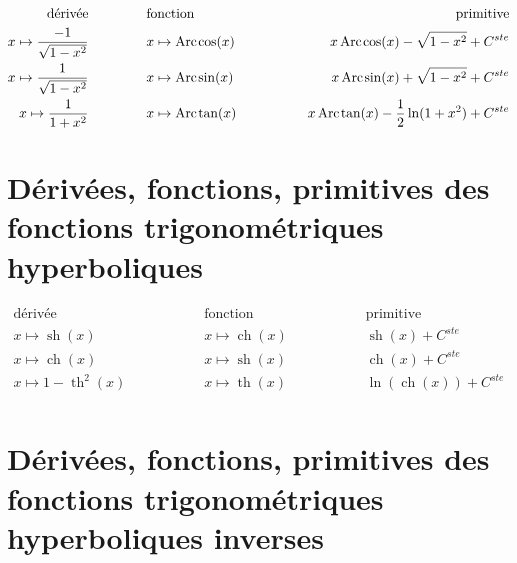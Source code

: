 \documentclass[a4paper,12pt]{report}
\renewcommand{\sinh}{\mathop{\mathrm{sh}}}
\renewcommand{\cosh}{\mathop{\mathrm{ch}}}
\renewcommand{\tanh}{\mathop{\mathrm{th}}}
\renewcommand{\arcsin}{\mathop{\mathrm{Arc\mspace{2mu}sin}}}
\renewcommand{\arccos}{\mathop{\mathrm{Arc\mspace{2mu}cos}}}
\renewcommand{\arctan}{\mathop{\mathrm{Arc\mspace{2mu}tan}}}
\begin{document}
\begin{align*}
\textrm{dérivée} \hspace{1.5cm} & \textrm{fonction} \hspace{1.5cm} & \textrm{primitive}  \\ 
x \mapsto \frac{-1}{ \sqrt{1 - x^2}} \hspace{1.5cm} & x \mapsto \arccos(x) \hspace{1.5cm} & x \arccos(x) - \sqrt{1 - x^2 } + C^{ste}  \\
x \mapsto \frac{1}{ \sqrt{1 - x^2}} \hspace{1.5cm} & x \mapsto \arcsin(x) \hspace{1.5cm} & x \arcsin(x) + \sqrt{1 - x^2 } + C^{ste}   \\
x \mapsto \frac{1}{ 1 + x^2} \hspace{1.5cm} & x \mapsto \arctan(x) \hspace{1.5cm} &  x \arctan(x) - \frac{1}{2} \ln( 1 + x^2) + C^{ste} \\
\end{align*}


\section{Dérivées, fonctions, primitives des fonctions trigonométriques hyperboliques}

\begin{align*}
\textrm{dérivée} \hspace{2cm} & \textrm{fonction} \hspace{2cm} & \textrm{primitive}  \\ 
x \mapsto \sinh(x) \hspace{2cm} & x \mapsto \cosh(x) \hspace{2cm} & \sinh(x) + C^{ste}  \\
x \mapsto \cosh(x) \hspace{2cm} & x \mapsto \sinh(x) \hspace{2cm} & \cosh(x) + C^{ste}   \\
x \mapsto 1 - \tanh\nolimits^2(x) \hspace{2cm} & x \mapsto \tanh(x) \hspace{2cm} & \ln( \cosh(x)) + C^{ste} \\
\end{align*}



\section{Dérivées, fonctions, primitives des fonctions trigonométriques hyperboliques inverses}
\end{document}
